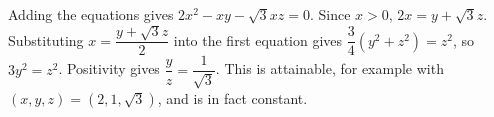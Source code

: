 Adding the equations gives $2x^2-xy-\sqrt3xz=0$. Since $x>0$, $2x=y+\sqrt3z$. Substituting $x=\dfrac{y+\sqrt3z}{2}$ into the first equation gives $\dfrac{3}{4}(y^2+z^2)=z^2$, so $3y^2=z^2$. Positivity gives $\dfrac{y}{z}=\boxed{\dfrac{1}{\sqrt3}}$. This is attainable, for example with $(x,y,z)=(2,1,\sqrt3)$, and is in fact constant.
